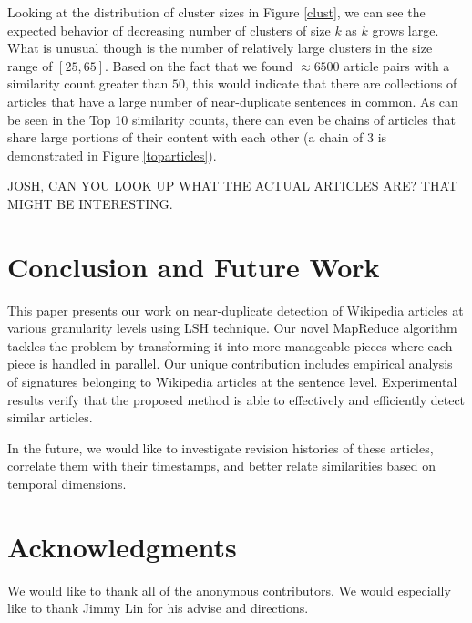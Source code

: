\documentclass{acm_proc_article-sp}
\begin{document}
Looking at the distribution of cluster sizes in Figure \ref{clust}, we can see the expected behavior of decreasing number of clusters of size $k$ as $k$ grows large. What is unusual though is the number of relatively large clusters in the size range of $[25, 65]$. Based on the fact that we found $\approx 6500$ article pairs with a similarity count greater than $50$, this would indicate that there are collections of articles that have a large number of near-duplicate sentences in common. As can be seen in the Top 10 similarity counts, there can even be chains of articles that share large portions of their content with each other (a chain of 3 is demonstrated in Figure \ref{toparticles}).

JOSH, CAN YOU LOOK UP WHAT THE ACTUAL ARTICLES ARE? THAT MIGHT BE INTERESTING.


\section{Conclusion and Future Work}
This paper presents our work on near-duplicate detection of Wikipedia articles at various granularity levels using LSH technique. Our novel MapReduce algorithm tackles the problem by transforming it into more manageable pieces where each piece is handled in parallel. Our unique contribution includes empirical analysis of signatures belonging to Wikipedia articles at the sentence level. Experimental results verify that the proposed method is able to effectively and efficiently detect similar articles.

In the future, we would like to investigate revision histories of these articles, correlate them with their timestamps, and better relate similarities based on temporal dimensions. 

\section{Acknowledgments}
We would like to thank all of the anonymous contributors. We would especially like to thank Jimmy Lin for his advise and directions.



\balancecolumns
\end{document}
